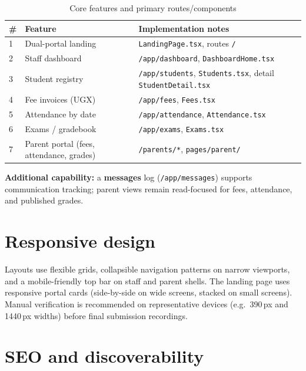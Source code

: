 \documentclass[11pt,a4paper]{article}
\begin{document}
\begin{table}[h]
  \centering
  \caption{Core features and primary routes/components}
  \label{tab:features}
  \begin{tabular}{@{}p{}p{}p{}@{}}
    \toprule
    \textbf{\#} & \textbf{Feature} & \textbf{Implementation notes} \\
    \midrule
    1 & Dual-portal landing & \texttt{LandingPage.tsx}, routes \texttt{/} \\
    2 & Staff dashboard & \texttt{/app/dashboard}, \texttt{DashboardHome.tsx} \\
    3 & Student registry & \texttt{/app/students}, \texttt{Students.tsx}, detail \texttt{StudentDetail.tsx} \\
    4 & Fee invoices (UGX) & \texttt{/app/fees}, \texttt{Fees.tsx} \\
    5 & Attendance by date & \texttt{/app/attendance}, \texttt{Attendance.tsx} \\
    6 & Exams / gradebook & \texttt{/app/exams}, \texttt{Exams.tsx} \\
    7 & Parent portal (fees, attendance, grades) & \texttt{/parents/*}, \texttt{pages/parent/} \\
    \bottomrule
  \end{tabular}
\end{table}

\noindent
\textbf{Additional capability:} a \textbf{messages} log (\texttt{/app/messages}) supports communication tracking; parent views remain read-focused for fees, attendance, and published grades.

\section{Responsive design}

Layouts use flexible grids, collapsible navigation patterns on narrow viewports, and a mobile-friendly top bar on staff and parent shells. The landing page uses responsive portal cards (side-by-side on wide screens, stacked on small screens). Manual verification is recommended on representative devices (e.g.\ 390\,px and 1440\,px widths) before final submission recordings.

\section{SEO and discoverability}
\end{document}
